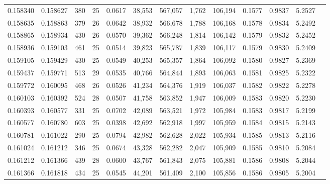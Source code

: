 \begin{tabular}{rrrrrrrrrrrrr}
0.158340 & 0.158627 &   380 &  25 &                                     0.0617 &  38,553 & 567,057 &   1,762 & 106,194 & 0.1577 & 0.9837 & 5.2527 \\
0.158635 & 0.158863 &   379 &  26 &                                     0.0642 &  38,932 & 566,678 &   1,788 & 106,168 & 0.1578 & 0.9834 & 5.2492 \\
0.158865 & 0.158934 &   430 &  26 &                                     0.0570 &  39,362 & 566,248 &   1,814 & 106,142 & 0.1579 & 0.9832 & 5.2452 \\
0.158936 & 0.159103 &   461 &  25 &                                     0.0514 &  39,823 & 565,787 &   1,839 & 106,117 & 0.1579 & 0.9830 & 5.2409 \\
0.159105 & 0.159429 &   430 &  25 &                                     0.0549 &  40,253 & 565,357 &   1,864 & 106,092 & 0.1580 & 0.9827 & 5.2369 \\
0.159437 & 0.159771 &   513 &  29 &                                     0.0535 &  40,766 & 564,844 &   1,893 & 106,063 & 0.1581 & 0.9825 & 5.2322 \\
0.159772 & 0.160095 &   468 &  26 &                                     0.0526 &  41,234 & 564,376 &   1,919 & 106,037 & 0.1582 & 0.9822 & 5.2278 \\
0.160103 & 0.160392 &   524 &  28 &                                     0.0507 &  41,758 & 563,852 &   1,947 & 106,009 & 0.1583 & 0.9820 & 5.2230 \\
0.160393 & 0.160577 &   331 &  25 &                                     0.0702 &  42,089 & 563,521 &   1,972 & 105,984 & 0.1583 & 0.9817 & 5.2199 \\
0.160577 & 0.160780 &   603 &  25 &                                     0.0398 &  42,692 & 562,918 &   1,997 & 105,959 & 0.1584 & 0.9815 & 5.2143 \\
0.160781 & 0.161022 &   290 &  25 &                                     0.0794 &  42,982 & 562,628 &   2,022 & 105,934 & 0.1585 & 0.9813 & 5.2116 \\
0.161024 & 0.161212 &   346 &  25 &                                     0.0674 &  43,328 & 562,282 &   2,047 & 105,909 & 0.1585 & 0.9810 & 5.2084 \\
0.161212 & 0.161366 &   439 &  28 &                                     0.0600 &  43,767 & 561,843 &   2,075 & 105,881 & 0.1586 & 0.9808 & 5.2044 \\
0.161366 & 0.161818 &   434 &  25 &                                     0.0545 &  44,201 & 561,409 &   2,100 & 105,856 & 0.1586 & 0.9805 & 5.2004 \\

\end{tabular}
